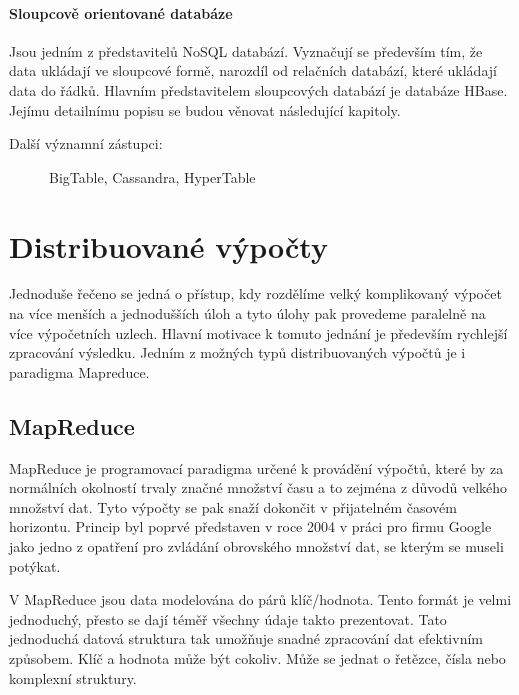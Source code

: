 \documentclass[thesis=M,czech]{FITthesis}[2012/06/26]
\begin{document}
\paragraph{Sloupcově orientované databáze}
Jsou jedním z představitelů NoSQL databází. Vyznačují se především tím, že data ukládají ve sloupcové formě, narozdíl od relačních databází, které ukládají data do řádků. Hlavním představitelem sloupcových databází je databáze HBase. Jejímu detailnímu popisu se budou věnovat následující kapitoly.
\begin{description}
	\item[Další významní zástupci: ] BigTable, Cassandra, HyperTable
\end{description}

\section{Distribuované výpočty}
Jednoduše řečeno se jedná o přístup, kdy rozdělíme velký komplikovaný výpočet na více menších a jednodušších úloh a tyto úlohy pak provedeme paralelně na více výpočetních uzlech. Hlavní motivace k tomuto jednání je především rychlejší zpracování výsledku. Jedním z možných typů distribuovaných výpočtů je i paradigma Mapreduce. 

\subsection{MapReduce}
MapReduce je programovací paradigma určené k provádění výpočtů, které by za normálních okolností trvaly značné množství času a to zejména z důvodů velkého množství dat. Tyto výpočty se pak snaží dokončit v přijatelném časovém horizontu. Princip byl poprvé představen v roce 2004 v  práci pro firmu Google jako jedno z opatření pro zvládání obrovského množství dat, se kterým se museli potýkat.

V MapReduce jsou data modelována do párů klíč/hodnota. Tento formát je velmi jednoduchý, přesto se dají téměř všechny údaje takto prezentovat. Tato jednoduchá datová struktura tak umožňuje snadné zpracování dat efektivním způsobem. Klíč a hodnota může být cokoliv. Může se jednat o řetězce, čísla nebo komplexní struktury.
\end{document}
